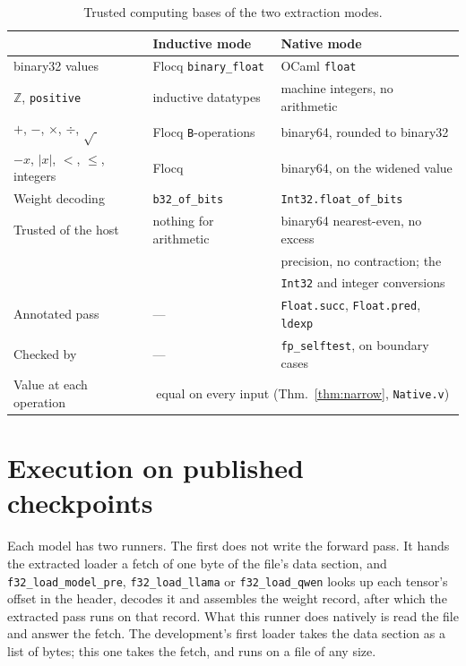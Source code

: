 \documentclass[11pt]{article}
\theoremstyle{plain}
\theoremstyle{definition}
\newcommand{\code}[1]{\texttt{#1}}
\begin{document}
\begin{table}[t]
\centering
\footnotesize
\begin{tabular}{lll}
\toprule
& \textbf{Inductive mode} & \textbf{Native mode} \\
\midrule
binary32 values      & Flocq \code{binary\_float}        & OCaml \code{float} \\
$\mathbb{Z}$, \code{positive} & inductive datatypes      & machine integers, no arithmetic \\
$+$, $-$, $\times$, $\div$, $\sqrt{\ }$ & Flocq \code{B}-operations & binary64, rounded to binary32 \\
$-x$, $|x|$, $<$, $\le$, integers & Flocq                & binary64, on the widened value \\
Weight decoding      & \code{b32\_of\_bits}              & \code{Int32.float\_of\_bits} \\
Trusted of the host  & nothing for arithmetic            & binary64 nearest-even, no excess \\
                     &                                   & precision, no contraction; the \\
                     &                                   & \code{Int32} and integer conversions \\
Annotated pass       & ---                               & \code{Float.succ}, \code{Float.pred}, \code{ldexp} \\
Checked by           & ---                               & \code{fp\_selftest}, on boundary cases \\
Value at each operation & \multicolumn{2}{c}{equal on every input (Thm.~\ref{thm:narrow}, \code{Native.v})} \\
\bottomrule
\end{tabular}
\caption{Trusted computing bases of the two extraction modes.}
\label{tab:tcb}
\end{table}

\section{Execution on published checkpoints}
\label{sec:exec}

Each model has two runners. The first does not write the forward pass. It hands
the extracted loader a fetch of one byte of the file's data section, and
\code{f32\_load\_model\_pre}, \code{f32\_load\_llama} or
\code{f32\_load\_qwen} looks up each tensor's offset in the header, decodes it
and assembles the weight record, after which the extracted pass runs on that
record. What this runner does natively is read the file and answer the fetch.
The development's first loader takes the data section as a list of bytes; this
one takes the fetch, and runs on a file of any size.
\end{document}
